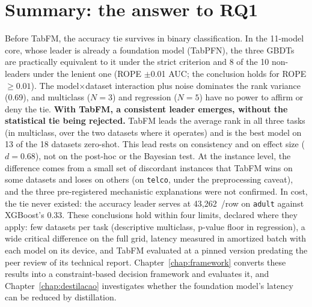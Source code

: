 \section{Summary: the answer to RQ1}
\label{sec:cap5-sintese}

Before TabFM, the accuracy tie survives in binary classification. In
the 11-model core, whose leader is already a foundation model
(TabPFN), the three GBDTs are practically equivalent to it under the
strict criterion and 8 of the 10 non-leaders under the lenient one
(ROPE $\pm$0.01 AUC; the conclusion holds for ROPE $\geq 0.01$). The
model$\times$dataset interaction plus noise dominates the rank variance
(0.69), and multiclass ($N{=}3$) and regression ($N{=}5$) have no power
to affirm or deny the tie. \textbf{With TabFM, a consistent leader
emerges, without the statistical tie being rejected.} TabFM leads the
average rank in all three tasks (in multiclass, over the two datasets
where it operates) and is the best model on 13 of the 18 datasets
zero-shot. This lead rests on consistency and on effect size
($d=0.68$), not on the post-hoc or the Bayesian test. At the
instance level, the difference comes from a small set of discordant
instances that TabFM wins on some datasets and loses on others (on
\texttt{telco}, under the preprocessing caveat), and the three
pre-registered mechanistic explanations were not confirmed. In cost,
the tie never existed: the accuracy leader serves at 43{,}262~\us/row
on \texttt{adult} against XGBoost's 0.33. These conclusions hold
within four limits, declared where they apply: few datasets per task
(descriptive multiclass, p-value floor in regression), a wide critical
difference on the full grid, latency measured in amortized batch with
each model on its device, and TabFM evaluated at a pinned version
predating the peer review of its technical report.
Chapter~\ref{chap:framework} converts these results into a
constraint-based decision framework and evaluates it, and
Chapter~\ref{chap:destilacao} investigates whether the foundation
model's latency can be reduced by distillation.
